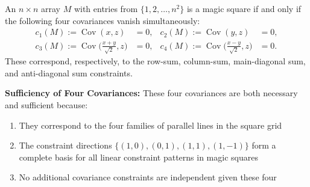 \begin{theorem}\label{thm:axial-covariance}
An $n\times n$ array $M$ with entries from $\{1,2,\ldots,n^2\}$ is a magic square if and only if the following four covariances vanish simultaneously:
\begin{align}
    c_1(M) := \operatorname{Cov}(x,z) &= 0, & c_2(M) := \operatorname{Cov}(y,z) &= 0,\\
    c_3(M) := \operatorname{Cov}\!\bigl(\tfrac{x+y}{\sqrt{2}},z\bigr) &= 0, & c_4(M) := \operatorname{Cov}\!\bigl(\tfrac{x-y}{\sqrt{2}},z\bigr) &= 0.
\end{align}
These correspond, respectively, to the row-sum, column-sum, main-diagonal sum, and anti-diagonal sum constraints.

\textbf{Sufficiency of Four Covariances:} These four covariances are both necessary and sufficient because:
\begin{enumerate}
    \item They correspond to the four families of parallel lines in the square grid
    \item The constraint directions $\{(1,0), (0,1), (1,1), (1,-1)\}$ form a complete basis for all linear constraint patterns in magic squares
    \item No additional covariance constraints are independent given these four
\end{enumerate}
\end{theorem}

